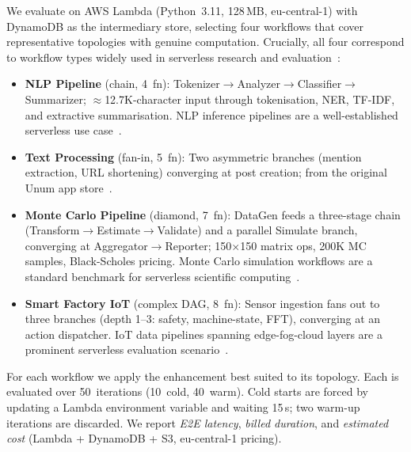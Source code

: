 \documentclass[runningheads]{llncs}
\begin{document}
We evaluate on AWS Lambda (Python~3.11, 128\,MB, eu-central-1) with DynamoDB as the intermediary store, selecting four workflows that cover representative topologies with genuine computation. Crucially, all four correspond to workflow types widely used in serverless research and evaluation~\cite{eismann2021serverless}:
\begin{itemize}\setlength{\itemsep}{1pt}
\item \textbf{NLP Pipeline} (chain, 4~fn): Tokenizer$\to$Analyzer$\to$Classifier$\to$Summarizer; $\approx$12.7K-character input through tokenisation, NER, TF-IDF, and extractive summarisation. NLP inference pipelines are a well-established serverless use case~\cite{mankala2025nlp}.
\item \textbf{Text Processing} (fan-in, 5~fn): Two asymmetric branches (mention extraction, URL shortening) converging at post creation; from the original Unum app store~\cite{285171}.
\item \textbf{Monte Carlo Pipeline} (diamond, 7~fn): DataGen feeds a three-stage chain (Transform$\to$Estimate$\to$Validate) and a parallel Simulate branch, converging at Aggregator$\to$Reporter; 150$\times$150 matrix ops, 200K MC samples, Black-Scholes pricing. Monte Carlo simulation workflows are a standard benchmark for serverless scientific computing~\cite{hautz2023afcl,barcelona2022crucial}.
\item \textbf{Smart Factory IoT} (complex DAG, 8~fn): Sensor ingestion fans out to three branches (depth 1--3: safety, machine-state, FFT), converging at an action dispatcher. IoT data pipelines spanning edge-fog-cloud layers are a prominent serverless evaluation scenario~\cite{poojara2021iot}.
\end{itemize}
For each workflow we apply the enhancement best suited to its topology. Each is evaluated over 50~iterations (10~cold, 40~warm). Cold starts are forced by updating a Lambda environment variable and waiting 15\,s; two warm-up iterations are discarded. We report \emph{E2E latency}, \emph{billed duration}, and \emph{estimated cost} (Lambda + DynamoDB + S3, eu-central-1 pricing).
\end{document}
